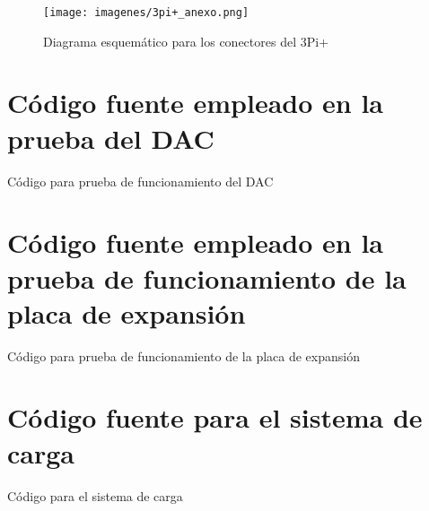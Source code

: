 \begin{figure}[H]
    \centering
    \texttt{[image: imagenes/3pi+\_anexo.png]}
    \caption{Diagrama esquemático para los conectores del 3Pi+}
    \label{fig:3pi+_anexo}
\end{figure}

\section{Código fuente empleado en la prueba del DAC}

\label{sec:codigo_dac}


\begin{table}[H]
    \caption{Código para prueba de funcionamiento del DAC}
\end{table}

\section{Código fuente empleado en la prueba de funcionamiento de la placa de expansión}
\label{sec:codigo_prueba_expansion}

\begin{table}[H]
    \caption{Código para prueba de funcionamiento de la placa de expansión}
\end{table}

\section{Código fuente para el sistema de carga}
\label{sec:codigo_expansion}


\begin{table}[H]
    \caption{Código para el sistema de carga}
\end{table}